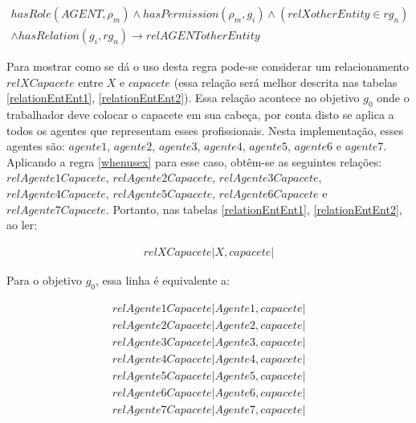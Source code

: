 \begin{eqnarray}\label{whenusex} \nonumber
    hasRole(AGENT,\rho_m) \wedge hasPermission(\rho_m,g_i) \wedge (relXotherEntity \in rg_n)  \\ 
    \wedge hasRelation(g_i,rg_n) \to relAGENTotherEntity 
\end{eqnarray}


Para mostrar como se dá o uso desta regra pode-se considerar um relacionamento $ relXCapacete$ entre $X$ e $capacete$ (essa relação será melhor descrita nas tabelas \ref{relationEntEnt1}, \ref{relationEntEnt2}). Essa relação acontece no objetivo $g_0$ onde o trabalhador deve colocar o capacete em sua cabeça, por conta disto se aplica a todos os agentes que representam esses profissionais. Nesta implementação, esses agentes são: $agente1$, $agente2$, $agente3$, $agente4$, $agente5$, $agente6$ e $agente7$. Aplicando a regra \ref{whenusex} para esse caso, obtêm-se as seguintes relações: $relAgente1Capacete$, $relAgente2Capacete$, $relAgente3Capacete$, $relAgente4Capacete$, $relAgente5Capacete$, $relAgente6Capacete$ e $relAgente7Capacete$. Portanto, nas tabelas \ref{relationEntEnt1}, \ref{relationEntEnt2}, ao ler:  

\begin{eqnarray}
	relXCapacete | X,capacete |
\end{eqnarray}

Para o objetivo $g_0$, essa linha é equivalente a: 

\begin{eqnarray}
relAgente1Capacete | Agente1 ,capacete | \nonumber \\
relAgente2Capacete | Agente2 ,capacete | \nonumber \\ 
relAgente3Capacete | Agente3 ,capacete | \nonumber \\ 
relAgente4Capacete | Agente4 ,capacete | \nonumber \\
relAgente5Capacete | Agente5 ,capacete | \nonumber \\
relAgente6Capacete | Agente6 ,capacete | \nonumber \\
relAgente7Capacete | Agente7 ,capacete | \nonumber \\
\nonumber \\
\end{eqnarray}

